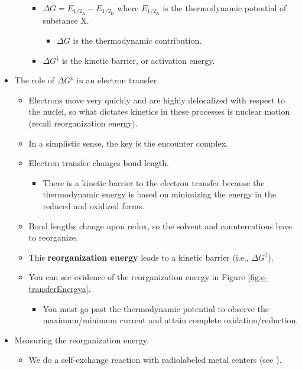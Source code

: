 \documentclass[../notes.tex]{subfiles}
\begin{document}
\begin{itemize}
\begin{enumerate}
\begin{itemize}
            \item $\Delta G=E_{1/2_\text{A}}-E_{1/2_\text{B}}$ where $E_{1/2_\text{X}}$ is the thermodynamic potential of substance X.
            \begin{itemize}
                \item $\Delta G$ is the thermodynamic contribution.
            \end{itemize}
            \item $\Delta G^\ddagger$ is the kinetic barrier, or activation energy.
        \end{itemize}
    \end{enumerate}
    \item The role of $\Delta G^\ddagger$ in an electron transfer.
    \begin{itemize}
        \item Electrons move very quickly and are highly delocalized with respect to the nuclei, so what dictates kinetics in these processes is nuclear motion (recall reorganization energy).
        \item In a simplistic sense, the key is the \ce{[A^n + B^{(n+1)}]^*} encounter complex.
        \item Electron transfer changes bond length.
        \begin{itemize}
            \item There is a kinetic barrier to the electron transfer because the thermodynamic energy is based on minimizing the energy in the reduced and oxidized forms.
        \end{itemize}
        \item Bond lengths change upon redox, so the solvent and countercations have to reorganize.
        \item This \textbf{reorganization energy} leads to a kinetic barrier (i.e., $\Delta G^\ddagger$).
        \item You can see evidence of the reorganization energy in Figure \ref{fig:e-transferEnergya}.
        \begin{itemize}
            \item You must go past the thermodynamic potential to observe the maximum/minimum current and attain complete oxidation/reduction.
        \end{itemize}
    \end{itemize}
    \item Measuring the reorganization energy.
    \begin{itemize}
        \item We do a self-exchange reaction with radiolabeled metal centers (see \textcite{bib:CHEM20100Notes}).

\end{itemize}
\end{itemize}
\end{document}

